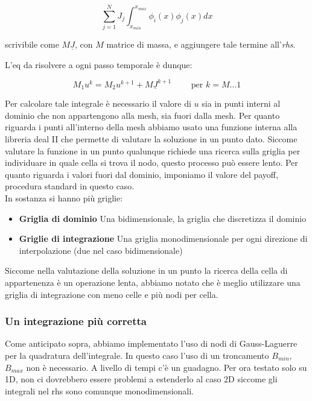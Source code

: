 \documentclass[a4paper,10pt]{article}
\begin{document}
\begin{equation*}
 \sum_{j=1}^N J_j\int_{x_{min}}^{x_{max}} \phi_i(x)\phi_j(x)dx
\end{equation*}

scrivibile come $M\underline{J}$, con $M$ matrice di massa, e aggiungere tale termine all'\emph{rhs}.

L'eq da risolvere a ogni passo temporale è dunque:

\begin{equation*}
 M_1u^k=M_2u^{k+1}+M\underline{J}^{k+1}  \qquad \text{ per } k=M\dots1
\end{equation*}


Per calcolare tale integrale è necessario il valore di $u$ sia in punti interni al dominio che non appartengono alla mesh, sia fuori dalla mesh. Per quanto riguarda i punti all'interno della mesh abbiamo usato una funzione interna alla libreria deal II che permette di valutare la soluzione in un punto dato. Siccome valutare la funzione in un punto qualunque richiede una ricerca sulla griglia per individuare in quale cella si trova il nodo, questo processo può essere lento. Per quanto riguarda i valori fuori dal dominio, imponiamo il valore del payoff, procedura standard in questo caso.\\

In sostanza si hanno più griglie:
\begin{itemize}
 \item \textbf{Griglia di dominio} Una bidimensionale, la griglia che discretizza il dominio
 \item \textbf{Griglie di integrazione} Una griglia monodimensionale per ogni direzione di interpolazione (due nel caso bidimensionale)
\end{itemize}

Siccome nella valutazione della soluzione in un punto la ricerca della cella di appartenenza è un operazione lenta, abbiamo notato che è meglio utilizzare una griglia di integrazione con meno celle e più nodi per cella.

\subsubsection{Un integrazione più corretta}
Come anticipato sopra, abbiamo implementato l'uso di nodi di Gauss-Laguerre per la quadratura dell'integrale. In questo caso l'uso di un troncamento $B_{min}$, $B_{max}$ non è necessario. A livello di tempi c'è un guadagno. Per ora testato solo su 1D, non ci dovrebbero essere problemi a estenderlo al caso 2D siccome gli integrali nel rhs sono comunque monodimensionali.
\end{document}
